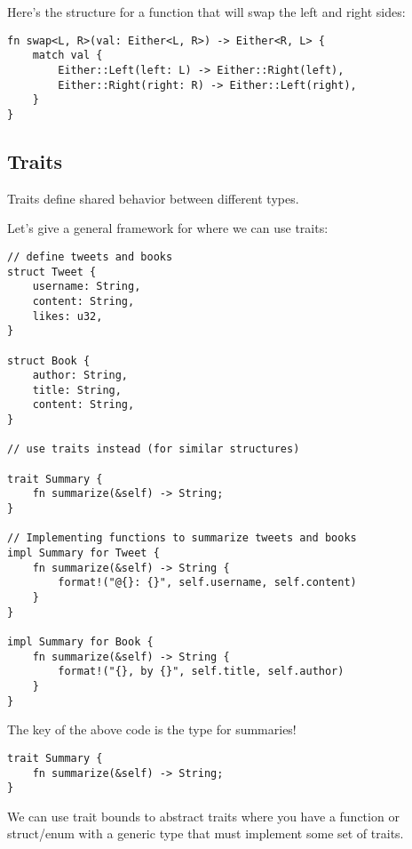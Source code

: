 Here's the structure for a function that will swap the left and right sides:
\begin{lstlisting}[frame = none]
fn swap<L, R>(val: Either<L, R>) -> Either<R, L> {
    match val {
        Either::Left(left: L) -> Either::Right(left),
        Either::Right(right: R) -> Either::Left(right),
    }
}
\end{lstlisting}

\subsection{Traits}
\begin{definition}
Traits define shared behavior between different types.
\end{definition}

Let's give a general framework for where we can use traits:
\begin{lstlisting}[]
// define tweets and books
struct Tweet {
    username: String,
    content: String,
    likes: u32,
}

struct Book {
    author: String,
    title: String,
    content: String,
}

// use traits instead (for similar structures)

trait Summary {
    fn summarize(&self) -> String;
}    

// Implementing functions to summarize tweets and books
impl Summary for Tweet {
    fn summarize(&self) -> String {
        format!("@{}: {}", self.username, self.content)
    }
}

impl Summary for Book {
    fn summarize(&self) -> String {
        format!("{}, by {}", self.title, self.author)
    }
}
\end{lstlisting}


The key of the above code is the  type for summaries!

\begin{lstlisting}
trait Summary {
    fn summarize(&self) -> String;
}    
\end{lstlisting}

\begin{definition}
We can use trait bounds to abstract traits where you have a function or struct/enum with a generic type that must implement some set of traits.
\end{definition}

